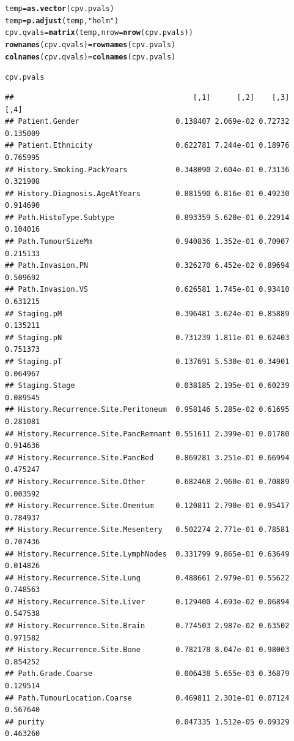\documentclass{article}\usepackage[]{graphicx}\usepackage[]{color}
\makeatletter
\newcommand{\hlstr}[1]{\textcolor[rgb]{0.192,0.494,0.8}{#1}}%
\newcommand{\hlstd}[1]{\textcolor[rgb]{0.345,0.345,0.345}{#1}}%
\newcommand{\hlkwb}[1]{\textcolor[rgb]{0.69,0.353,0.396}{#1}}%
\newcommand{\hlkwc}[1]{\textcolor[rgb]{0.333,0.667,0.333}{#1}}%
\newcommand{\hlkwd}[1]{\textcolor[rgb]{0.737,0.353,0.396}{\textbf{#1}}}%
\newenvironment{kframe}{%
 \def\at@end@of@kframe{}%
 \ifinner\ifhmode%
  \def\at@end@of@kframe{\end{minipage}}%
  \begin{minipage}{\columnwidth}%
 \fi\fi%
 \def\FrameCommand##1{\hskip\@totalleftmargin \hskip-\fboxsep
 \colorbox{shadecolor}{##1}\hskip-\fboxsep
     \hskip-\linewidth \hskip-\@totalleftmargin \hskip\columnwidth}%
 \MakeFramed {\advance\hsize-\width
   \@totalleftmargin\z@ \linewidth\hsize
   \@setminipage}}%
 {\par\unskip\endMakeFramed%
 \at@end@of@kframe}
\newenvironment{knitrout}{}{} %
\makeatother
\begin{document}
\begin{knitrout}
\begin{kframe}
\begin{alltt}
\hlstd{temp} \hlkwb{=} \hlkwd{as.vector}\hlstd{(cpv.pvals)}
\hlstd{temp} \hlkwb{=} \hlkwd{p.adjust}\hlstd{(temp,} \hlstr{"holm"}\hlstd{)}
\hlstd{cpv.qvals} \hlkwb{=} \hlkwd{matrix}\hlstd{(temp,} \hlkwc{nrow} \hlstd{=} \hlkwd{nrow}\hlstd{(cpv.pvals))}
\hlkwd{rownames}\hlstd{(cpv.qvals)} \hlkwb{=} \hlkwd{rownames}\hlstd{(cpv.pvals)}
\hlkwd{colnames}\hlstd{(cpv.qvals)} \hlkwb{=} \hlkwd{colnames}\hlstd{(cpv.pvals)}

\hlstd{cpv.pvals}
\end{alltt}
\begin{verbatim}
##                                         [,1]      [,2]    [,3]     [,4]
## Patient.Gender                      0.138407 2.069e-02 0.72732 0.135009
## Patient.Ethnicity                   0.622781 7.244e-01 0.18976 0.765995
## History.Smoking.PackYears           0.348090 2.604e-01 0.73136 0.321908
## History.Diagnosis.AgeAtYears        0.881590 6.816e-01 0.49230 0.914690
## Path.HistoType.Subtype              0.893359 5.620e-01 0.22914 0.104016
## Path.TumourSizeMm                   0.940836 1.352e-01 0.70907 0.215133
## Path.Invasion.PN                    0.326270 6.452e-02 0.89694 0.509692
## Path.Invasion.VS                    0.626581 1.745e-01 0.93410 0.631215
## Staging.pM                          0.396481 3.624e-01 0.85889 0.135211
## Staging.pN                          0.731239 1.811e-01 0.62403 0.751373
## Staging.pT                          0.137691 5.530e-01 0.34901 0.064967
## Staging.Stage                       0.038185 2.195e-01 0.60239 0.089545
## History.Recurrence.Site.Peritoneum  0.958146 5.285e-02 0.61695 0.281081
## History.Recurrence.Site.PancRemnant 0.551611 2.399e-01 0.01780 0.914636
## History.Recurrence.Site.PancBed     0.869281 3.251e-01 0.66994 0.475247
## History.Recurrence.Site.Other       0.682468 2.960e-01 0.70889 0.003592
## History.Recurrence.Site.Omentum     0.120811 2.790e-01 0.95417 0.784937
## History.Recurrence.Site.Mesentery   0.502274 2.771e-01 0.78581 0.707436
## History.Recurrence.Site.LymphNodes  0.331799 9.865e-01 0.63649 0.014826
## History.Recurrence.Site.Lung        0.488661 2.979e-01 0.55622 0.748563
## History.Recurrence.Site.Liver       0.129400 4.693e-02 0.06894 0.547538
## History.Recurrence.Site.Brain       0.774503 2.987e-02 0.63502 0.971582
## History.Recurrence.Site.Bone        0.782178 8.047e-01 0.98003 0.854252
## Path.Grade.Coarse                   0.006438 5.655e-03 0.36879 0.129514
## Path.TumourLocation.Coarse          0.469811 2.301e-01 0.07124 0.567640
## purity                              0.047335 1.512e-05 0.09329 0.463260

\end{verbatim}
\end{kframe}
\end{knitrout}
\end{document}
